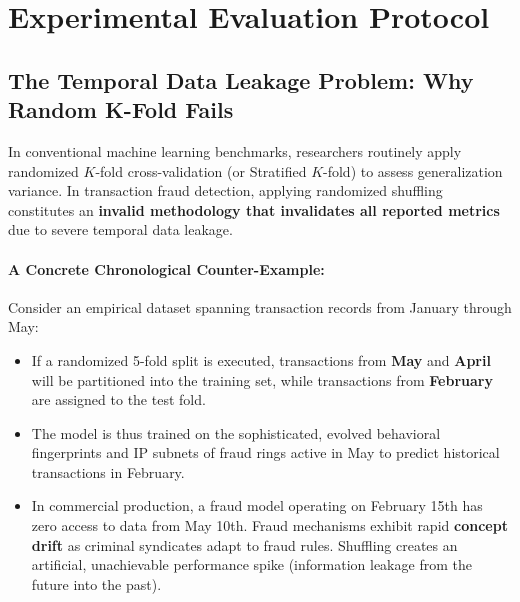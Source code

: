 \documentclass[11pt,a4paper]{article}
\begin{document}
\section{Experimental Evaluation Protocol}

\subsection{The Temporal Data Leakage Problem: Why Random K-Fold Fails}
In conventional machine learning benchmarks, researchers routinely apply randomized $K$-fold cross-validation (or Stratified $K$-fold) to assess generalization variance. In transaction fraud detection, applying randomized shuffling constitutes an \textbf{invalid methodology that invalidates all reported metrics} due to severe temporal data leakage.

\paragraph{A Concrete Chronological Counter-Example:}
Consider an empirical dataset spanning transaction records from January through May:
\begin{itemize}[leftmargin=*]
    \item If a randomized 5-fold split is executed, transactions from \textbf{May} and \textbf{April} will be partitioned into the training set, while transactions from \textbf{February} are assigned to the test fold.
    \item The model is thus trained on the sophisticated, evolved behavioral fingerprints and IP subnets of fraud rings active in May to predict historical transactions in February.
    \item In commercial production, a fraud model operating on February 15th has zero access to data from May 10th. Fraud mechanisms exhibit rapid \textbf{concept drift} as criminal syndicates adapt to fraud rules. Shuffling creates an artificial, unachievable performance spike (information leakage from the future into the past).
\end{itemize}
\end{document}
